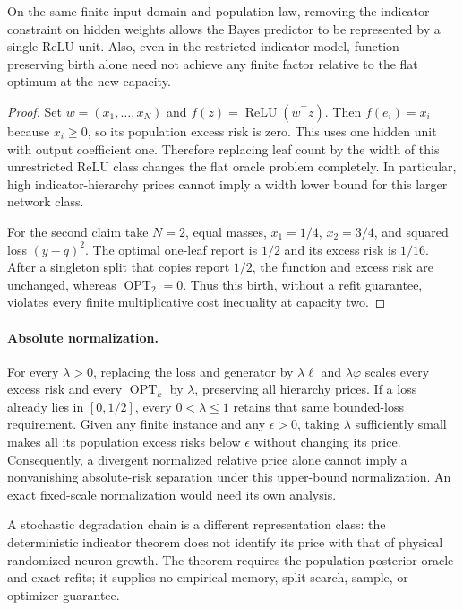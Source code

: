 \begin{proposition}
\label{prop:p9-nontransfer}
On the same finite input domain and population law, removing the indicator
constraint on hidden weights allows the Bayes predictor to be represented
by a single ReLU unit. Also, even in the restricted indicator model,
function-preserving birth alone need not achieve any finite factor relative
to the flat optimum at the new capacity.
\end{proposition}
\begin{proof}
Set $w=(x_1,\ldots,x_N)$ and $f(z)=\operatorname{ReLU}(w^\top z)$.
Then $f(e_i)=x_i$ because $x_i\ge0$, so its population excess risk is zero.
This uses one hidden unit with output coefficient one. Therefore replacing
leaf count by the width of this unrestricted ReLU class changes the flat
oracle problem completely. In particular, high indicator-hierarchy prices
cannot imply a width lower bound for this larger network class.

For the second claim take $N=2$, equal masses, $x_1=1/4$, $x_2=3/4$, and
squared loss $(y-q)^2$. The optimal one-leaf report is $1/2$ and its excess
risk is $1/16$. After a singleton split that copies report $1/2$, the
function and excess risk are unchanged, whereas $\operatorname{OPT}_2=0$.
Thus this birth, without a refit guarantee, violates every finite
multiplicative cost inequality at capacity two.
\end{proof}

\paragraph{Absolute normalization.}
For every $\lambda>0$, replacing the loss and generator by
$\lambda\ell$ and $\lambda\varphi$ scales every excess risk and every
$\operatorname{OPT}_k$ by $\lambda$, preserving all hierarchy prices.
If a loss already lies in $[0,1/2]$, every $0<\lambda\le1$ retains that
same bounded-loss requirement. Given any finite instance and any
$\epsilon>0$, taking $\lambda$ sufficiently small makes all its
population excess risks below $\epsilon$ without changing its price.
Consequently, a divergent normalized relative price alone cannot imply
a nonvanishing absolute-risk separation under this upper-bound
normalization. An exact fixed-scale normalization would need its own
analysis.

A stochastic degradation chain is a different representation class: the
deterministic indicator theorem does not identify its price with that of
physical randomized neuron growth. The theorem requires the population
posterior oracle and exact refits; it supplies no empirical memory,
split-search, sample, or optimizer guarantee.
